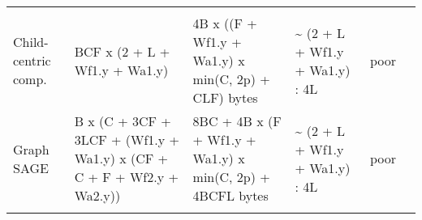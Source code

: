 \documentclass[10pt,oneside]{memoir}
\begin{document}
\begin{longtable}[]{@{}llllll@{}}
\begin{minipage}[t]{0.12\columnwidth}
\strut
\end{minipage}\tabularnewline
\begin{minipage}[t]{0.19\columnwidth}\raggedright
Child-centric comp.\strut
\end{minipage} & \begin{minipage}[t]{0.10\columnwidth}\raggedright
BCF x (2 + L + Wf1.y + Wa1.y)\strut
\end{minipage} & \begin{minipage}[t]{0.13\columnwidth}\raggedright
4B x ((F + Wf1.y + Wa1.y) x min(C, 2p) + CLF) bytes\strut
\end{minipage} & \begin{minipage}[t]{0.19\columnwidth}\raggedright
\textasciitilde{} (2 + L + Wf1.y + Wa1.y) : 4L\strut
\end{minipage} & \begin{minipage}[t]{0.11\columnwidth}\raggedright
poor\strut
\end{minipage} & \begin{minipage}[t]{0.12\columnwidth}\raggedright
\strut
\end{minipage}\tabularnewline
\begin{minipage}[t]{0.19\columnwidth}\raggedright
Graph SAGE\strut
\end{minipage} & \begin{minipage}[t]{0.10\columnwidth}\raggedright
B x (C + 3CF + 3LCF + (Wf1.y + Wa1.y) x (CF + C + F + Wf2.y +
Wa2.y))\strut
\end{minipage} & \begin{minipage}[t]{0.13\columnwidth}\raggedright
8BC + 4B x (F + Wf1.y + Wa1.y) x min(C, 2p) + 4BCFL bytes\strut
\end{minipage} & \begin{minipage}[t]{0.19\columnwidth}\raggedright
\textasciitilde{} (2 + L + Wf1.y + Wa1.y) : 4L\strut
\end{minipage} & \begin{minipage}[t]{0.11\columnwidth}\raggedright
poor\strut
\end{minipage} & \begin{minipage}[t]{0.12\columnwidth}\raggedright
\strut
\end{minipage}\tabularnewline
\begin{minipage}[t]{0.19\columnwidth}\raggedright
\strut
\end{minipage} & \begin{minipage}[t]{0.10\columnwidth}\raggedright
\strut
\end{minipage} & \begin{minipage}[t]{0.13\columnwidth}\raggedright

\end{minipage}
\end{longtable}
\end{document}
